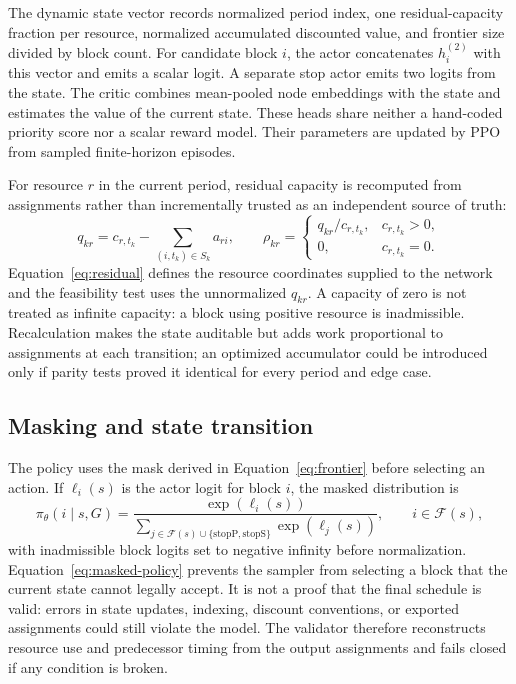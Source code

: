\documentclass[11pt]{article}
\begin{document}
The dynamic state vector records normalized period index, one residual-capacity fraction per resource, normalized accumulated discounted value, and frontier size divided by block count. For candidate block $i$, the actor concatenates $h_i^{(2)}$ with this vector and emits a scalar logit. A separate stop actor emits two logits from the state. The critic combines mean-pooled node embeddings with the state and estimates the value of the current state. These heads share neither a hand-coded priority score nor a scalar reward model. Their parameters are updated by PPO from sampled finite-horizon episodes.

For resource $r$ in the current period, residual capacity is recomputed from assignments rather than incrementally trusted as an independent source of truth:
\begin{equation}
q_{kr}=c_{r,t_k}-\sum_{(i,t_k)\in S_k}a_{ri},\qquad \rho_{kr}=\begin{cases}q_{kr}/c_{r,t_k},&c_{r,t_k}>0,\\0,&c_{r,t_k}=0.\end{cases}
\label{eq:residual}
\end{equation}
Equation~\ref{eq:residual} defines the resource coordinates supplied to the network and the feasibility test uses the unnormalized $q_{kr}$. A capacity of zero is not treated as infinite capacity: a block using positive resource is inadmissible. Recalculation makes the state auditable but adds work proportional to assignments at each transition; an optimized accumulator could be introduced only if parity tests proved it identical for every period and edge case.

\subsection{Masking and state transition}
The policy uses the mask derived in Equation~\ref{eq:frontier} before selecting an action. If $\ell_i(s)$ is the actor logit for block $i$, the masked distribution is
\begin{equation}
\pi_\theta(i\mid s,G)=\frac{\exp(\ell_i(s))}{\sum_{j\in\mathcal F(s)\cup\{\mathrm{stopP},\mathrm{stopS}\}}\exp(\ell_j(s))},\qquad i\in\mathcal F(s),
\label{eq:masked-policy}
\end{equation}
with inadmissible block logits set to negative infinity before normalization. Equation~\ref{eq:masked-policy} prevents the sampler from selecting a block that the current state cannot legally accept. It is not a proof that the final schedule is valid: errors in state updates, indexing, discount conventions, or exported assignments could still violate the model. The validator therefore reconstructs resource use and predecessor timing from the output assignments and fails closed if any condition is broken.
\end{document}
